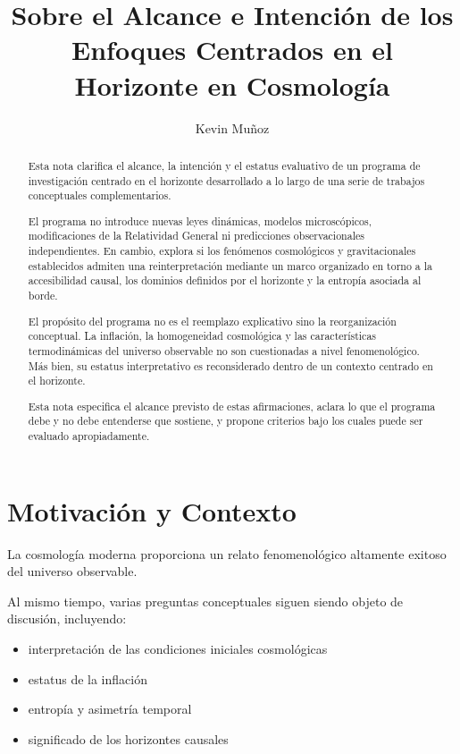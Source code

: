 \documentclass[12pt,a4paper]{article}
\title{Sobre el Alcance e Intenci\'on de los Enfoques Centrados en el Horizonte en Cosmolog\'ia}
\author{Kevin Mu\~noz}
\date{}
\begin{document}
\maketitle

\begin{abstract}
Esta nota clarifica el alcance, la intención y el estatus evaluativo de un programa de investigación centrado en el horizonte desarrollado a lo largo de una serie de trabajos conceptuales complementarios.

El programa no introduce nuevas leyes dinámicas, modelos microscópicos, modificaciones de la Relatividad General ni predicciones observacionales independientes. En cambio, explora si los fenómenos cosmológicos y gravitacionales establecidos admiten una reinterpretación mediante un marco organizado en torno a la accesibilidad causal, los dominios definidos por el horizonte y la entropía asociada al borde.

El propósito del programa no es el reemplazo explicativo sino la reorganización conceptual. La inflación, la homogeneidad cosmológica y las características termodinámicas del universo observable no son cuestionadas a nivel fenomenológico. Más bien, su estatus interpretativo es reconsiderado dentro de un contexto centrado en el horizonte.

Esta nota especifica el alcance previsto de estas afirmaciones, aclara lo que el programa debe y no debe entenderse que sostiene, y propone criterios bajo los cuales puede ser evaluado apropiadamente.
\end{abstract}

\section{Motivación y Contexto}

La cosmología moderna proporciona un relato fenomenológico altamente exitoso del universo observable.

Al mismo tiempo, varias preguntas conceptuales siguen siendo objeto de discusión, incluyendo:

\begin{itemize}
  \item interpretación de las condiciones iniciales cosmológicas
  \item estatus de la inflación
  \item entropía y asimetría temporal
  \item significado de los horizontes causales
\end{itemize}
\end{document}
